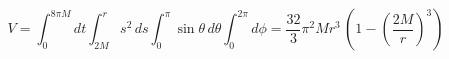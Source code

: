 \begin{equation}
V=\int_{0}^{8\pi M} dt \int_{2M}^{r}s^2\, ds \int_{0}^{\pi }\sin\theta
\,d\theta \int_{0}^{2\pi}d\phi=\frac{32}{3}\pi^2 M
r^3\,\left(1-\left(\frac{2M}{r}\right)^3 \right)
\end{equation}

